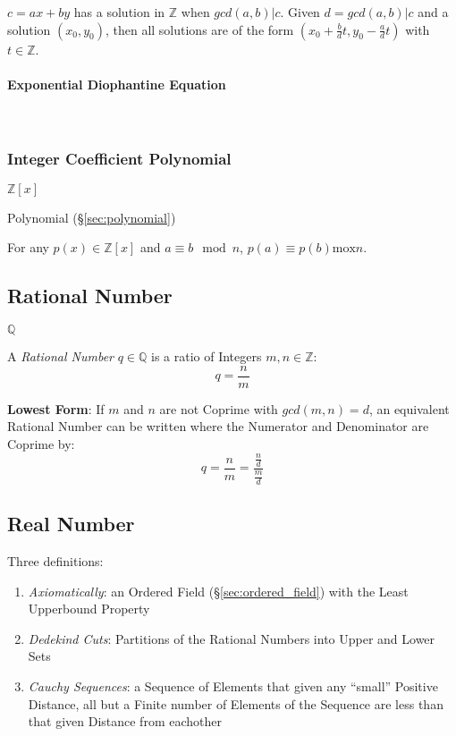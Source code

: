 $c = ax + by$ has a solution in $\mathbb{Z}$ when $gcd(a,b)|c$. Given
$d=gcd(a,b)|c$ and a solution $(x_0, y_0)$, then all solutions are of
the form $(x_0 + \frac{b}{d}t, y_0 - \frac{a}{d}t)$ with $t \in
\mathbb{Z}$.



\paragraph{Exponential Diophantine Equation}
\label{sec:exponential_diophantine}
\hfill \\



\subsubsection{Integer Coefficient Polynomial}
\label{sec:integer_coefficient}

$\mathbb{Z}[x]$

Polynomial (\S\ref{sec:polynomial})

For any $p(x) \in \mathbb{Z}[x]$ and $a \equiv b \mod n$,
$p(a) \equiv p(b) \mathrm{mox }n$.



\subsection{Rational Number}\label{sec:rational}

$\mathbb{Q}$

A \emph{Rational Number} $q \in \mathbb{Q}$ is a ratio of Integers
$m,n \in \mathbb{Z}$:
\[
  q = \frac{n}{m}
\]

\textbf{Lowest Form}: If $m$ and $n$ are not Coprime with $gcd (m,n) =
d$, an equivalent Rational Number can be written where the Numerator
and Denominator are Coprime by:
\[
  q = \frac{n}{m} = \frac{\frac{n}{d}}{\frac{m}{d}}
\]



\subsection{Real Number}\label{sec:real_number}

Three definitions:
\begin{enumerate}
  \item \emph{Axiomatically}: an Ordered Field
    (\S\ref{sec:ordered_field}) with the Least Upperbound Property
  \item \emph{Dedekind Cuts}: Partitions of the Rational Numbers into
    Upper and Lower Sets
  \item \emph{Cauchy Sequences}: a Sequence of Elements that given any
    ``small'' Positive Distance, all but a Finite number of Elements
    of the Sequence are less than that given Distance from eachother
\end{enumerate}



